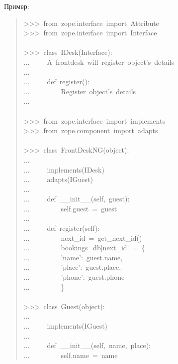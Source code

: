 \documentclass[a4paper,openany,twoside,final]{book}
\begin{document}
Пример:

\begin{quote}{\ttfamily \raggedright \noindent
>{}>{}>~from~zope.interface~import~Attribute\\
>{}>{}>~from~zope.interface~import~Interface\\
~\\
>{}>{}>~class~IDesk(Interface):\\
...~~~~~\textquotedbl{}\textquotedbl{}\textquotedbl{}A~frontdesk~will~register~object's~details\textquotedbl{}\textquotedbl{}\textquotedbl{}\\
...\\
...~~~~~def~register():\\
...~~~~~~~~~\textquotedbl{}\textquotedbl{}\textquotedbl{}Register~object's~details\textquotedbl{}\textquotedbl{}\textquotedbl{}\\
...\\
~\\
>{}>{}>~from~zope.interface~import~implements\\
>{}>{}>~from~zope.component~import~adapts\\
~\\
>{}>{}>~class~FrontDeskNG(object):\\
...\\
...~~~~~implements(IDesk)\\
...~~~~~adapts(IGuest)\\
...\\
...~~~~~def~\_\_init\_\_(self,~guest):\\
...~~~~~~~~~self.guest~=~guest\\
...\\
...~~~~~def~register(self):\\
...~~~~~~~~~next\_id~=~get\_next\_id()\\
...~~~~~~~~~bookings\_db{[}next\_id{]}~=~\{\\
...~~~~~~~~~'name':~guest.name,\\
...~~~~~~~~~'place':~guest.place,\\
...~~~~~~~~~'phone':~guest.phone\\
...~~~~~~~~~\}\\
~\\
>{}>{}>~class~Guest(object):\\
...\\
...~~~~~implements(IGuest)\\
...\\
...~~~~~def~\_\_init\_\_(self,~name,~place):\\
...~~~~~~~~~self.name~=~name\\
}
\end{quote}
\end{document}
